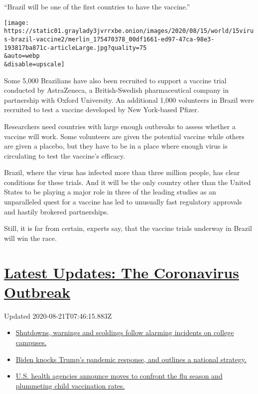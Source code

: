 ``Brazil will be one of the first countries to have the vaccine.''

\texttt{[image: https://static01.graylady3jvrrxbe.onion/images/2020/08/15/world/15virus-brazil-vaccine2/merlin\_175470378\_00df1661-ed97-47ca-98e3-193817ba871c-articleLarge.jpg?quality=75\\\&auto=webp\\\&disable=upscale]}

Some 5,000 Brazilians have also been recruited to support a vaccine
trial conducted by AstraZeneca, a British-Swedish pharmaceutical company
in partnership with Oxford University. An additional 1,000 volunteers in
Brazil were recruited to test a vaccine developed by New York-based
Pfizer.

Researchers need countries with large enough outbreaks to assess whether
a vaccine will work. Some volunteers are given the potential vaccine
while others are given a placebo, but they have to be in a place where
enough virus is circulating to test the vaccine's efficacy.

Brazil, where the virus has infected more than three million people, has
clear conditions for these trials. And it will be the only country other
than the United States to be playing a major role in three of the
leading studies as an unparalleled quest for a vaccine has led to
unusually fast regulatory approvals and hastily brokered partnerships.

Still, it is far from certain, experts say, that the vaccine trials
underway in Brazil will win the race.

\hypertarget{latest-updates-the-coronavirus-outbreak}{%
\section{\texorpdfstring{\href{https://www.nytimes3xbfgragh.onion/2020/08/20/world/coronavirus-covid.html?action=click\&pgtype=Article\&state=default\&region=MAIN_CONTENT_1\&context=storylines_live_updates}{Latest
Updates: The Coronavirus
Outbreak}}{Latest Updates: The Coronavirus Outbreak}}\label{latest-updates-the-coronavirus-outbreak}}

Updated 2020-08-21T07:46:15.883Z

\begin{itemize}
\tightlist
\item
  \href{https://www.nytimes3xbfgragh.onion/2020/08/20/world/coronavirus-covid.html?action=click\&pgtype=Article\&state=default\&region=MAIN_CONTENT_1\&context=storylines_live_updates\#link-68774d88}{Shutdowns,
  warnings and scoldings follow alarming incidents on college campuses.}
\item
  \href{https://www.nytimes3xbfgragh.onion/2020/08/20/world/coronavirus-covid.html?action=click\&pgtype=Article\&state=default\&region=MAIN_CONTENT_1\&context=storylines_live_updates\#link-26b58724}{Biden
  knocks Trump's pandemic response, and outlines a national strategy.}
\item
  \href{https://www.nytimes3xbfgragh.onion/2020/08/20/world/coronavirus-covid.html?action=click\&pgtype=Article\&state=default\&region=MAIN_CONTENT_1\&context=storylines_live_updates\#link-4e542da3}{U.S.
  health agencies announce moves to confront the flu season and
  plummeting child vaccination rates.}
\end{itemize}

